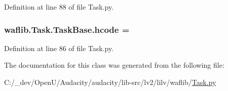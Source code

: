 Definition at line 88 of file Task.\+py.

\subsubsection[{\texorpdfstring{hcode}{hcode}}]{ waflib.\+Task.\+Task\+Base.\+hcode = \textquotesingle{}\textquotesingle{}\hspace{0.3cm}{\ttfamily [static]}}\hypertarget{classwaflib_1_1_task_1_1_task_base_a94a711279b6bbfa5ee163487db1b557f}{}\label{classwaflib_1_1_task_1_1_task_base_a94a711279b6bbfa5ee163487db1b557f}


Definition at line 86 of file Task.\+py.



The documentation for this class was generated from the following file\+:\begin{DoxyCompactItemize}
\item 
C\+:/\+\_\+dev/\+Open\+U/\+Audacity/audacity/lib-\/src/lv2/lilv/waflib/\hyperlink{lilv_2waflib_2_task_8py}{Task.\+py}\end{DoxyCompactItemize}
